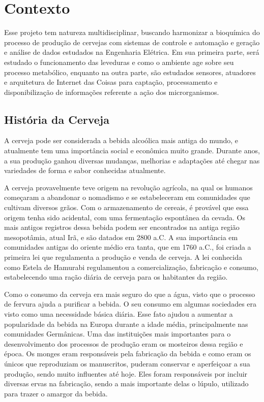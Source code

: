 \chapter{Contexto}

Esse projeto tem natureza multidisciplinar, buscando harmonizar a bioquímica do
processo de produção de cervejas com sistemas de controle e automação e
geração e análise de dados estudados na Engenharia Elétrica. Em sua primeira
parte, será estudado o funcionamento das leveduras e como o ambiente age sobre
seu processo metabólico, enquanto na outra parte, são estudados sensores,
atuadores e arquitetura de Internet das Coisas para captação, processamento e
disponibilização de informações referente a ação dos microrganismos.

\section{História da Cerveja}


A cerveja pode ser considerada a bebida alcoólica mais antiga do mundo, e atualmente tem uma importância social e econômica muito grande. Durante anos, a sua produção ganhou diversas mudanças, melhorias e adaptações até chegar nas variedades de forma e sabor conhecidas atualmente. 


A cerveja provavelmente teve origem na revolução agrícola, na qual os humanos começaram a abandonar o nomadismo e se estabeleceram em comunidades que cultivam diversos grãos. Com o armazenamento de cereais, é provável que essa origem tenha sido acidental, com uma fermentação espontânea da cevada. Os mais antigos registros dessa bebida podem ser encontrados na antiga região mesopotâmia, atual Irã, e são datados em 2800 a.C. A sua importância em comunidades antigas do oriente médio era tanta, que em 1760 a.C., foi criada a primeira lei que regulamenta a produção e venda de cerveja. A lei conhecida como Estela de Hamurabi regulamentou a comercialização, fabricação e consumo, estabelecendo uma ração diária de cerveja para os habitantes da região. 


Como o consumo da cerveja era mais seguro do que a água, visto que o processo de fervura ajuda a purificar a bebida. O  seu consumo em algumas sociedades era visto como uma necessidade básica diária. Esse fato ajudou a aumentar a popularidade da bebida na Europa durante a idade média, principalmente nas comunidades Germânicas. Uma das instituições mais importantes para o desenvolvimento dos processos de produção eram os mosteiros dessa região e época. Os monges eram responsáveis pela fabricação da bebida e como eram os únicos que reproduziam os manuscritos, puderam conservar e aperfeiçoar a sua produção, sendo muito influentes até hoje. Eles foram responsáveis por incluir diversas ervas na fabricação, sendo a mais importante delas o lúpulo, utilizado para trazer o amargor da bebida. 


